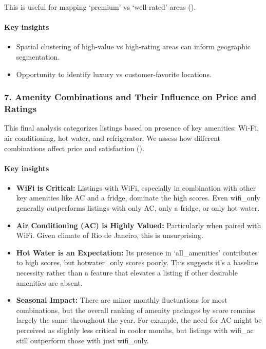 This is useful for mapping `premium' vs `well-rated' areas ().

\vspace{0.5em}
\paragraph{Key insights}
\begin{itemize}
    \item Spatial clustering of high-value vs high-rating areas can inform geographic segmentation.
    \item Opportunity to identify luxury vs customer-favorite locations.
\end{itemize}


\subsubsection*{7. Amenity Combinations and Their Influence on Price and Ratings}

This final analysis categorizes listings based on presence of key amenities: Wi-Fi, air conditioning, hot water, and refrigerator. We assess how different combinations affect price and satisfaction ().

\vspace{0.5em}
\paragraph{Key insights}
\begin{itemize}
    \item \textbf{WiFi is Critical:} Listings with WiFi, especially in combination with other key amenities like AC and a fridge, dominate the high scores. Even wifi\_only generally outperforms listings with only AC, only a fridge, or only hot water.
    \item \textbf{Air Conditioning (AC) is Highly Valued:} Particularly when paired with WiFi. Given climate of Rio de Janeiro, this is unsurprising.
    \item \textbf{Hot Water is an Expectation:} Its presence in `all\_amenities' contributes to high scores, but hotwater\_only scores poorly. This suggests it's a baseline necessity rather than a feature that elevates a listing if other desirable amenities are absent.
    \item \textbf{Seasonal Impact:} There are minor monthly fluctuations for most combinations, but the overall ranking of amenity packages by score remains largely the same throughout the year. For example, the need for AC might be perceived as slightly less critical in cooler months, but listings with wifi\_ac still outperform those with just wifi\_only.
\end{itemize}

